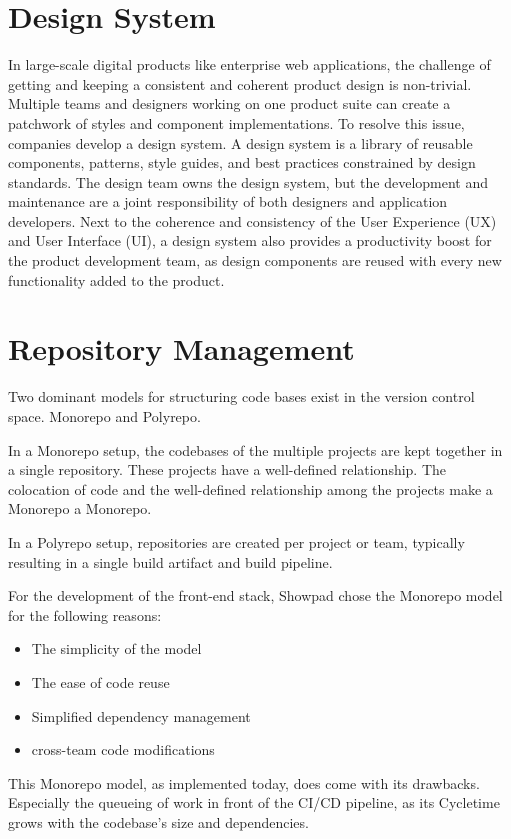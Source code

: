 \section{Design System}
\label{sec:designsystem}
In large-scale digital products like enterprise web applications, the challenge of getting and keeping a consistent and coherent product design is non-trivial. Multiple teams and designers working on one product suite can create a patchwork of styles and component implementations. To resolve this issue, companies develop a design system. A design system is a library of reusable components, patterns, style guides, and best practices constrained by design standards. The design team owns the design system, but the development and maintenance are a joint responsibility of both designers and application developers. Next to the coherence and consistency of the User Experience (UX) and User Interface (UI), a design system also provides a productivity boost for the product development team, as design components are reused with every new functionality added to the product.
\section{Repository Management}
Two dominant models for structuring code bases exist in the version control space. \gls{Monorepo} and Polyrepo. 

In a \gls{Monorepo} setup, the codebases of the multiple projects are kept together in a single repository. These projects have a well-defined relationship. The colocation of code and the well-defined relationship among the projects make a Monorepo a Monorepo.

In a Polyrepo setup, repositories are created per project or team, typically resulting in a single build artifact and build pipeline.

For the development of the front-end stack, Showpad chose the \gls{Monorepo} model for the following reasons:
\begin{itemize}
    \item The simplicity of the model
    \item The ease of code reuse
    \item Simplified dependency management
    \item cross-team code modifications
\end{itemize}

This \gls{Monorepo} model, as implemented today, does come with its drawbacks. Especially the queueing of work in front of the CI/CD pipeline, as its \gls{Cycletime} grows with the codebase's size and dependencies.
